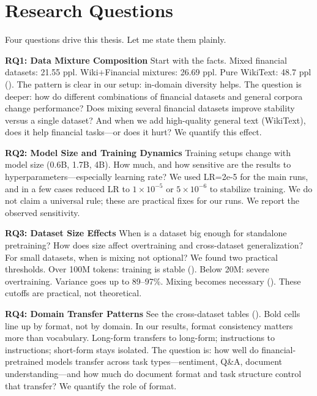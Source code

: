 \section{Research Questions}

Four questions drive this thesis. Let me state them plainly.

\textbf{RQ1: Data Mixture Composition}
Start with the facts. Mixed financial datasets: 21.55 ppl. Wiki+Financial mixtures: 26.69 ppl. Pure WikiText: 48.7 ppl (). The pattern is clear in our setup: in-domain diversity helps. The question is deeper: how do different combinations of financial datasets and general corpora change performance? Does mixing several financial datasets improve stability versus a single dataset? And when we add high-quality general text (WikiText), does it help financial tasks—or does it hurt? We quantify this effect.

\textbf{RQ2: Model Size and Training Dynamics}
Training setups change with model size (0.6B, 1.7B, 4B). How much, and how sensitive are the results to hyperparameters—especially learning rate? We used LR=2e-5 for the main runs, and in a few cases reduced LR to $1\times10^{-5}$ or $5\times10^{-6}$ to stabilize training. We do not claim a universal rule; these are practical fixes for our runs. We report the observed sensitivity.

\textbf{RQ3: Dataset Size Effects}
When is a dataset big enough for standalone pretraining? How does size affect overtraining and cross-dataset generalization? For small datasets, when is mixing not optional? We found two practical thresholds. Over 100M tokens: training is stable (). Below 20M: severe overtraining. Variance goes up to 89--97\%. Mixing becomes necessary (). These cutoffs are practical, not theoretical.

\textbf{RQ4: Domain Transfer Patterns}
See the cross-dataset tables (). Bold cells line up by format, not by domain. In our results, format consistency matters more than vocabulary. Long-form transfers to long-form; instructions to instructions; short-form stays isolated. The question is: how well do financial-pretrained models transfer across task types—sentiment, Q\&A, document understanding—and how much do document format and task structure control that transfer? We quantify the role of format.


